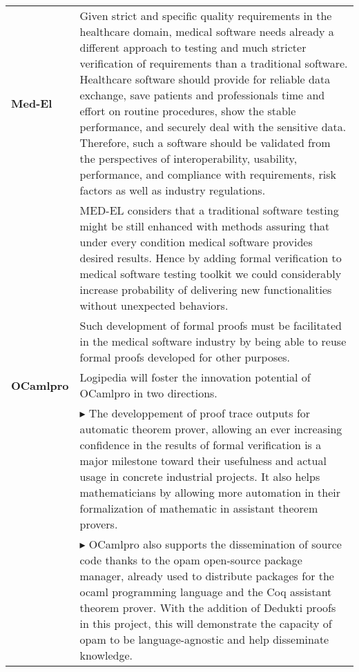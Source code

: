 \begin{longtable}{|p{}|p{}|}
\hline

{\bf Med-El}
&
Given strict and specific quality requirements in the healthcare
domain, medical software needs already a different approach to testing
and much stricter verification of requirements than a traditional
software. Healthcare software should provide for reliable data
exchange, save patients and professionals time and effort on routine
procedures, show the stable performance, and securely deal with the
sensitive data. Therefore, such a software should be validated from
the perspectives of interoperability, usability, performance, and
compliance with requirements, risk factors as well as industry
regulations.\\

&
\hspace{0.4cm}
MED-EL considers that a traditional software testing
might be still enhanced with methods assuring that under every
condition medical software provides desired results. Hence by adding
formal verification to medical software testing toolkit we could
considerably increase probability of delivering new functionalities
without unexpected behaviors.\\
&
\hspace{0.4cm}
Such development of formal proofs must be facilitated in the 
medical software industry by being able to reuse formal proofs developed
for other purposes.\\

\hline

{\bf OCamlpro} &

Logipedia will foster the innovation
potential of OCamlpro in two directions.\\

&
$\blacktriangleright$
The developpement of proof trace
outputs for automatic theorem prover, allowing an ever increasing
confidence in the results of formal verification is a major milestone
toward their usefulness and actual usage in concrete industrial
projects. It also helps mathematicians by allowing more automation in
their formalization of mathematic in assistant theorem provers.
\\

&
$\blacktriangleright$
OCamlpro also supports the dissemination of source code thanks to
the opam open-source package manager, already used to distribute packages
for the ocaml programming language and the Coq assistant theorem prover.
With the addition of Dedukti proofs in this project, this will demonstrate
the capacity of opam to be language-agnostic and help disseminate knowledge.
\\


\end{longtable}
